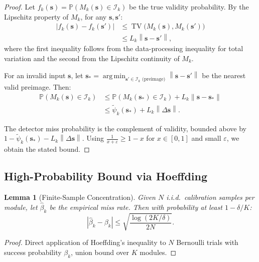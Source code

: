\documentclass[11pt,twocolumn]{article}
\newtheorem{lemma}[theorem]{Lemma}
\theoremstyle{definition}
\DeclareMathOperator*{\argmin}{arg\,min}
\DeclareMathOperator{\TV}{TV}
\newcommand{\Pbb}{\mathbb{P}}
\newcommand{\norm}[1]{\left\lVert#1\right\rVert}
\begin{document}
\begin{proof}
Let $f_k(\mathbf{s}) = \Pbb(M_k(\mathbf{s}) \in \mathcal{I}_k)$ be the true
validity probability.  By the Lipschitz property of $M_k$, for any
$\mathbf{s}, \mathbf{s}'$:
\begin{align}
  |f_k(\mathbf{s}) - f_k(\mathbf{s}')|
  &\le \TV\bigl( M_k(\mathbf{s}), M_k(\mathbf{s}') \bigr) \\
  &\le L_k \norm{\mathbf{s} - \mathbf{s}'},
\end{align}
where the first inequality follows from the data-processing inequality for
total variation and the second from the Lipschitz continuity of $M_k$.

For an invalid input $\mathbf{s}$, let $\mathbf{s}_* = \argmin_{\mathbf{s}'
\in \mathcal{I}_k \text{ (preimage)}} \norm{\mathbf{s} - \mathbf{s}'}$ be the
nearest valid preimage.  Then:
\begin{align}
  \Pbb(M_k(\mathbf{s}) \in \mathcal{I}_k)
  &\le \Pbb(M_k(\mathbf{s}_*) \in \mathcal{I}_k) + L_k \norm{\mathbf{s} - \mathbf{s}_*} \\
  &\le \tilde{\psi}_k(\mathbf{s}_*) + L_k \norm{\Delta\mathbf{s}}.
\end{align}

The detector miss probability is the complement of validity, bounded above by
$1 - \tilde{\psi}_k(\mathbf{s}_*) - L_k \norm{\Delta\mathbf{s}}$.  Using
$\frac{1}{x+\varepsilon} \ge 1-x$ for $x \in [0,1]$ and small $\varepsilon$,
we obtain the stated bound.
\end{proof}

\subsection{High-Probability Bound via Hoeffding}

\begin{lemma}[Finite-Sample Concentration]
\label{lem:hoeffding}
Given $N$ i.i.d.\ calibration samples per module, let $\hat{\beta}_k$ be the
empirical miss rate.  Then with probability at least $1-\delta/K$:
\begin{equation}
  |\hat{\beta}_k - \beta_k| \le \sqrt{\frac{\log(2K/\delta)}{2N}}.
\end{equation}
\end{lemma}

\begin{proof}
Direct application of Hoeffding's inequality to $N$ Bernoulli trials with
success probability $\beta_k$, union bound over $K$ modules.
\end{proof}
\end{document}
